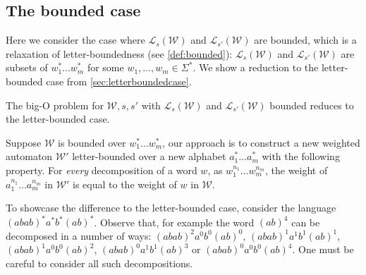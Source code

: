 \documentclass{lmcs}
\theoremstyle{plain}
\theoremstyle{definition}
\theoremstyle{remark}
\newcommand\lng[2]{\mathcal{L}_{#1}(#2)}
\newcommand\wa{\mathcal{W}}
\begin{document}
\subsection{The bounded case}
\label{sec:boundedtoletterbounded}

Here we consider the case where $\lng{s}{\wa}$ and $\lng{s'}{\wa}$ are bounded, which is a relaxation of letter-boundedness (see \cref{def:bounded}): $\lng{s}{\wa}$ and $\lng{s'}{\wa}$ are subsets of $w_1^*\dots w_m^*$ for some $w_1,\dots,w_m\in\Sigma^*$. We show a reduction to the letter-bounded case from \cref{sec:letterboundedcase}.

\begin{lem}\label{lem:btolb}
The big-O problem for $\wa, s, s'$ with $\lng{s}{\wa}$ and $\lng{s'}{\wa}$ bounded reduces to the letter-bounded case.
\end{lem}

Suppose $\wa$ is bounded over $w_1^*\dots w_m^*$, our approach is to construct a new weighted automaton $\wa'$ letter-bounded over a new alphabet $a_1^*\dots a_m^*$  with the following property. For \textit{every} decomposition of a word $w$, as $w_1^{n_1}\dots w_m^{n_m}$, the weight of $a_1^{n_1}\dots a_m^{n_m}$ in $\wa'$ is equal to the weight of $w$ in $\wa$.

\begin{sloppypar}To showcase the difference to the letter-bounded case, consider the language $(abab)^*a^*b^*(ab)^*$. Observe that, for example the word $(ab)^4$ can be decomposed in a number of ways: $(abab)^2a^0b^0(ab)^0$, $(abab)^1a^1b^1(ab)^1$, $(abab)^1a^0b^0(ab)^2$, $(abab)^0a^1b^1(ab)^3$ or $(abab)^0a^0b^0(ab)^4$.
One must be careful to consider all such decompositions.\end{sloppypar}
\end{document}
